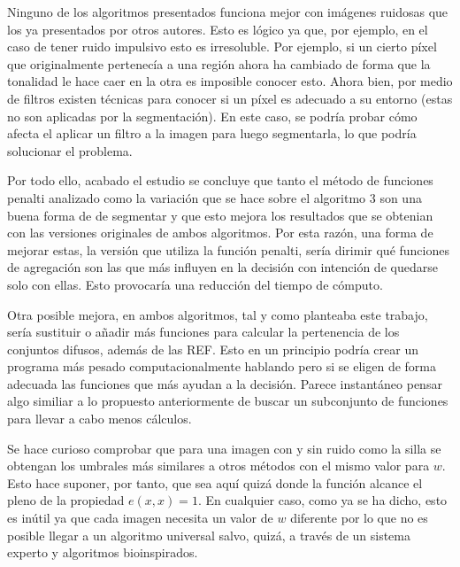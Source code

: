 Ninguno de los algoritmos presentados funciona mejor con imágenes ruidosas que los ya presentados por otros autores. Esto es lógico ya que, por ejemplo, en el caso de tener ruido impulsivo esto es irresoluble. Por ejemplo, si un cierto píxel que originalmente pertenecía a una región ahora ha cambiado de forma que la tonalidad le hace caer en la otra es imposible conocer esto. Ahora bien, por medio de filtros existen técnicas para conocer si un píxel es adecuado a su entorno (estas no son aplicadas por la segmentación). En este caso, se podría probar cómo afecta el aplicar un filtro a la imagen para luego segmentarla, lo que podría solucionar el problema.


Por todo ello, acabado el estudio se concluye que tanto el método de funciones penalti analizado como la variación que se hace sobre el algoritmo 3 son una buena forma de de segmentar y que esto mejora los resultados que se obtenian con las versiones originales de ambos algoritmos. Por esta razón, una forma de mejorar estas, la versión que utiliza la función penalti, sería dirimir qué funciones de agregación son las que más influyen en la decisión con intención de quedarse solo con ellas. Esto provocaría una reducción del tiempo de cómputo.

Otra posible mejora, en ambos algoritmos, tal y como planteaba este trabajo, sería sustituir o añadir más funciones para calcular la pertenencia de los conjuntos difusos, además de las REF. Esto en un principio podría crear un programa más pesado computacionalmente hablando pero si se eligen de forma adecuada las funciones que más ayudan a la decisión. Parece instantáneo pensar algo similiar a lo propuesto anteriormente de buscar un subconjunto de funciones para llevar a cabo menos cálculos.

Se hace curioso comprobar que para una imagen con y sin ruido como la silla se obtengan los umbrales más similares a otros métodos con el mismo valor para $w$. Esto hace suponer, por tanto, que sea aquí quizá donde la función alcance el pleno de la propiedad $e(x,x)=1$. En cualquier caso, como ya se ha dicho, esto es inútil ya que cada imagen necesita un valor de $w$ diferente por lo que no es posible llegar a un algoritmo universal salvo, quizá, a través de un sistema experto y algoritmos bioinspirados.

